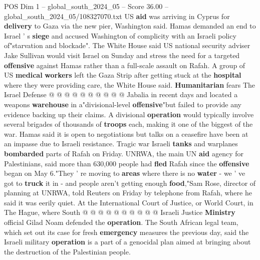 \begin{textsample}{POS Dim 1 – global\_south\_2024\_05 – Score 36.00 – global\_south\_2024\_05/108327070.txt}
US \textbf{aid} was arriving in Cyprus for \textbf{delivery} to Gaza via the new pier, Washington said.
Hamas demanded an end to Israel ' s \textbf{siege} and accused Washington of complicity with an Israeli policy of"starvation and blockade".
The White House said US national security adviser Jake Sullivan would visit Israel on Sunday and stress the need for a targeted \textbf{offensive} against Hamas rather than a full-scale assault on Rafah.
A group of US \textbf{medical} \textbf{workers} left the Gaza Strip after getting stuck at the \textbf{hospital} where they were providing care, the White House said. \textbf{Humanitarian} fears The Israel Defense @ @ @ @ @ @ @ @ @ @ Jabalia in recent days and located a weapons \textbf{warehouse} in a"divisional-level \textbf{offensive}"but failed to provide any evidence backing up their claims.
A divisional \textbf{operation} would typically involve several brigades of thousands of \textbf{troops} each, making it one of the biggest of the war.
Hamas said it is open to negotiations but talks on a ceasefire have been at an impasse due to Israeli resistance.
Tragic war Israeli \textbf{tanks} and warplanes \textbf{bombarded} parts of Rafah on Friday.
UNRWA, the main UN \textbf{aid} agency for Palestinians, said more than 630,000 people had \textbf{fled} Rafah since the \textbf{offensive} began on May 6."They ' re moving to \textbf{areas} where there is no \textbf{water} - we ' ve got to \textbf{truck} it in - and people aren't getting enough \textbf{food},"Sam Rose, director of planning at UNRWA, told Reuters on Friday by telephone from Rafah, where he said it was eerily quiet.
At the International Court of Justice, or World Court, in The Hague, where South @ @ @ @ @ @ @ @ @ @ Israeli Justice \textbf{Ministry} official Gilad Noam defended the \textbf{operation}.
The South African legal team, which set out its case for fresh \textbf{emergency} measures the previous day, said the Israeli military \textbf{operation} is a part of a genocidal plan aimed at bringing about the destruction of the Palestinian people.

\end{textsample}
